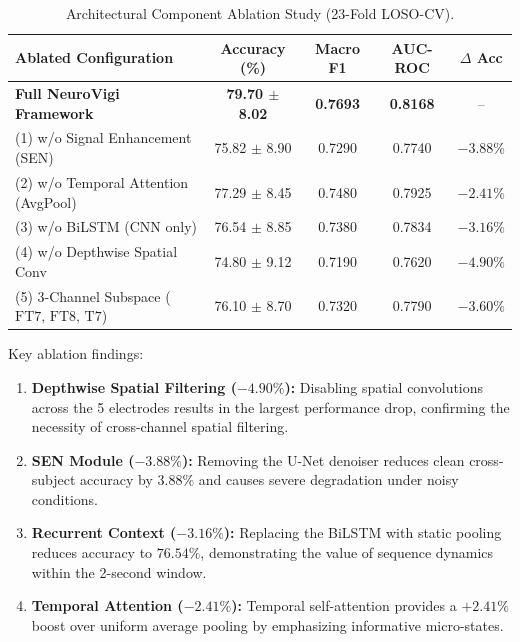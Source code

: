 \documentclass[conference]{IEEEtran}
\begin{document}
\begin{table}[t]
\caption{Architectural Component Ablation Study (23-Fold LOSO-CV).}
\label{tab:ablation_table}
\centering
\footnotesize
\setlength{\tabcolsep}{4.5pt}
\begin{tabular}{@{}lcccc@{}}
\toprule
\textbf{Ablated Configuration} & \textbf{Accuracy (\%)} & \textbf{Macro F1} & \textbf{AUC-ROC} & \textbf{$\Delta$ Acc} \\
\midrule
\textbf{Full NeuroVigi Framework} & \textbf{79.70 $\pm$ 8.02} & \textbf{0.7693} & \textbf{0.8168} & -- \\
(1) w/o Signal Enhancement (SEN) & 75.82 $\pm$ 8.90 & 0.7290 & 0.7740 & $-3.88\%$ \\
(2) w/o Temporal Attention (AvgPool) & 77.29 $\pm$ 8.45 & 0.7480 & 0.7925 & $-2.41\%$ \\
(3) w/o BiLSTM (CNN only) & 76.54 $\pm$ 8.85 & 0.7380 & 0.7834 & $-3.16\%$ \\
(4) w/o Depthwise Spatial Conv & 74.80 $\pm$ 9.12 & 0.7190 & 0.7620 & $-4.90\%$ \\
(5) 3-Channel Subspace ($\text{FT7, FT8, T7}$) & 76.10 $\pm$ 8.70 & 0.7320 & 0.7790 & $-3.60\%$ \\
\bottomrule
\end{tabular}
\end{table}

Key ablation findings:
\begin{enumerate}[leftmargin=*]
    \item \textbf{Depthwise Spatial Filtering ($-4.90\%$):} Disabling spatial convolutions across the 5 electrodes results in the largest performance drop, confirming the necessity of cross-channel spatial filtering.
    \item \textbf{SEN Module ($-3.88\%$):} Removing the U-Net denoiser reduces clean cross-subject accuracy by $3.88\%$ and causes severe degradation under noisy conditions.
    \item \textbf{Recurrent Context ($-3.16\%$):} Replacing the BiLSTM with static pooling reduces accuracy to $76.54\%$, demonstrating the value of sequence dynamics within the 2-second window.
    \item \textbf{Temporal Attention ($-2.41\%$):} Temporal self-attention provides a $+2.41\%$ boost over uniform average pooling by emphasizing informative micro-states.
\end{enumerate}
\end{document}
